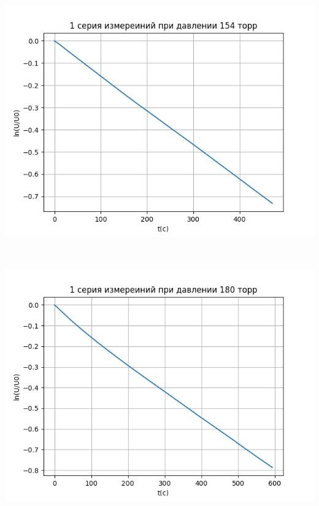 \
\\
\begin{minipage}{0.47\textwidth}
  \includegraphics[width=1\linewidth]{pic/154_1.png}
\end{minipage}
\begin{minipage}{0.04\textwidth}
\
\end{minipage}
\begin{minipage}{0.47\textwidth}
 \includegraphics[width=1\linewidth]{pic/180_1.png}
\end{minipage}
\\
\
\\
\\


